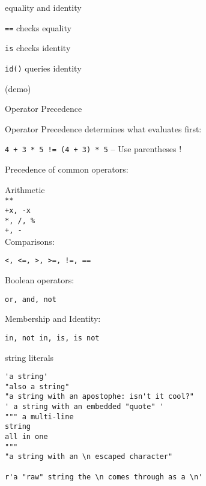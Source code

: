 \documentclass{beamer}
\begin{document}
\begin{frame}[fragile]{equality and identity}

{\large
\vspace{0.1in}
\verb|==| checks equality

\vspace{0.1in}
\verb|is| checks identity

\vspace{0.1in}
\verb|id()| queries identity
}

\vspace{0.2in}
(demo)


\end{frame}


\begin{frame}[fragile]{Operator Precedence}

{Operator Precedence determines what evaluates first:}

\verb^4 + 3 * 5 != (4 + 3) * 5^  --  Use parentheses !

Precedence of common operators:

Arithmetic \\
\verb!**! \\
\verb!+x, -x! \\	
\verb!*, /, %!	\\
\verb!+, -! \\

Comparisons:

\verb^<, <=, >, >=, !=, ==^

Boolean operators:
 
\verb!or, and, not!

Membership and Identity:

\verb!in, not in, is, is not!

\end{frame}



\begin{frame}[fragile]{string literals}

\begin{verbatim}
'a string'
"also a string"
"a string with an apostophe: isn't it cool?"
' a string with an embedded "quote" '
""" a multi-line
string
all in one
"""
"a string with an \n escaped character"

r'a "raw" string the \n comes through as a \n'
 
\end{verbatim}

\end{frame}
\end{document}
